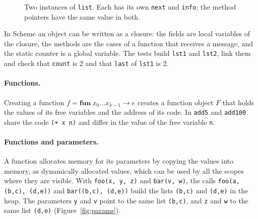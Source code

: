 \begin{figure}[h]
\centering
{}
\caption{Two instances of \texttt{list}. Each has its own \texttt{next} and \texttt{info}; the method pointers have the same value in both.}
\label{fig:objects}
\end{figure}

In Scheme an object can be written as a closure: the fields are local
variables of the closure, the methods are the cases of a function that
receives a message, and the static counter is a global variable. The tests
build \texttt{lst1} and \texttt{lst2}, link them and check that
\texttt{count} is 2 and that \texttt{last} of \texttt{lst1} is 2.

\paragraph{Functions.} Creating a function $f = \mathbf{fun}\ x_0 \dots
x_{k-1} \to e$ creates a function object $F$ that holds the values of its free
variables and the address of its code. In
\texttt{add5} and \texttt{add100} share the code \texttt{(+ x n)} and differ in
the value of the free variable \texttt{n}.

\paragraph{Functions and parameters.} A function allocates memory for its
parameters by copying the values into memory, as dynamically allocated
values, which can be used by all the scopes where they are visible. With
\texttt{foo(x, y, z)} and \texttt{bar(v, w)}, the calls
\texttt{foo(a, (b,c), (d,e))} and \texttt{bar((b,c), (d,e))} build the lists
\texttt{(b,c)} and \texttt{(d,e)} in the heap. The parameters \texttt{y} and
\texttt{v} point to the same list \texttt{(b,c)}, and \texttt{z} and
\texttt{w} to the same list \texttt{(d,e)} (Figure~\ref{fig:params}).


